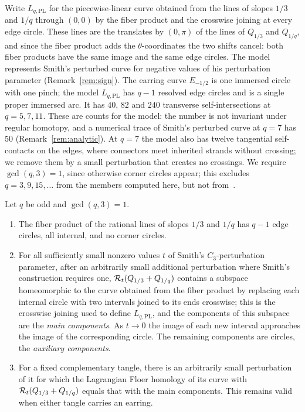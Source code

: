 Write $L_{q,\mathrm{PL}}$ for the piecewise-linear curve obtained from the lines of slopes $1/3$ and
$1/q$ through $(0,0)$ by the fiber product and the crosswise joining at every edge circle.  These
lines are the translates by $(0,\pi)$ of the lines of $Q_{1/3}$ and $Q_{1/q}$, and since the fiber
product adds the $\theta$-coordinates the two shifts cancel: both fiber products have the same image
and the same edge circles.  The model represents Smith's perturbed curve for negative values of his
perturbation parameter (Remark~\ref{rem:sign}).  The earring curve $E_{-1/2}$ is one immersed
circle with one pinch; the model $L_{q,\mathrm{PL}}$ has $q-1$ resolved edge circles and is a single proper
immersed arc.  It has $40$, $82$ and $240$ transverse self-intersections at
$q=5,7,11$.  These are counts for the model: the number is not invariant under regular homotopy, and a
numerical trace of Smith's perturbed curve at $q=7$ has $50$ (Remark~\ref{rem:analytic}).  At $q=7$
the model also has twelve tangential self-contacts on the edges, where connectors meet inherited
strands without crossing; we remove them by a small perturbation that creates no crossings.  We
require $\gcd(q,3)=1$, since otherwise corner circles appear; this excludes $q=3,9,15,\dots$ from the
members computed here, but not from~\cite[Thm.~1.1]{WuebbenII}.

\begin{proposition}\label{prop:smith-main}
Let $q$ be odd and $\gcd(q,3)=1$.
\begin{enumerate}
\item[(a)] The fiber product of the rational lines of slopes $1/3$ and $1/q$ has $q-1$ edge circles,
all internal, and no corner circles.
\item[(b)] For all sufficiently small nonzero values $t$ of Smith's $C_3$-perturbation parameter,
after an arbitrarily small additional perturbation where Smith's construction requires one,
$\mathcal{R}_t(Q_{1/3}+Q_{1/q})$ contains a subspace homeomorphic to the curve obtained from the fiber
product by replacing each internal circle with two intervals joined to its ends crosswise; this is
the crosswise joining used to define $L_{q,\mathrm{PL}}$, and the components of this subspace are the
\emph{main components}.  As $t\to0$ the image of each new interval approaches
the image of the corresponding circle.  The remaining components are circles, the \emph{auxiliary
components}.
\item[(c)] For a fixed complementary tangle, there is an arbitrarily small perturbation of it for
which the Lagrangian Floer homology of its curve with $\mathcal{R}_t(Q_{1/3}+Q_{1/q})$ equals that with the main
components.
This remains valid when either tangle carries an earring.
\end{enumerate}
\end{proposition}

